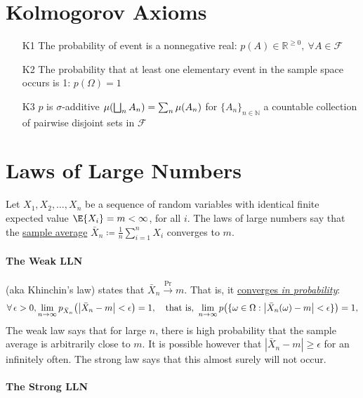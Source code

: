 \documentclass[a4paper]{article}
\theoremstyle{definition}
\newcommand\key\uline%
\renewcommand\right\mright%
\renewcommand\left\mleft%
\begin{document}
\section*{Kolmogorov Axioms}

\begin{itemize}
  \item[K1] The probability of event is a nonnegative real: 
    $p(A) \in \mathbb{R}^{\ge 0},\ \forall A\in\mathcal{F}$
  \item[K2] The probability that at least one elementary event in the sample
    space occurs is 1: $p(\Omega) = 1$
  \item[K3] $p$ is $\sigma$-additive
    \(\mu\left(\bigsqcup_{n}A_n\right)=\sum_{n}\mu(A_n)\)
    for ${\{A_n\}}_{n\in \mathbb{N}}$ a countable collection of pairwise
    disjoint sets in $\mathcal{F}$
\end{itemize}
\section*{Laws of Large Numbers}%
\label{sec:LLN}

Let $X_1, X_2, \ldots, X_n$ be a sequence of random variables with identical
finite expected value $\E{X_i} = m < \infty$, for all $i$.
The laws of large numbers say that the \key{sample average}
$\bar{X}_n\coloneqq\frac1n\sum_{i=1}^n X_i$ converges to $m$.

\paragraph{The Weak LLN}

(aka Khinchin's law) states that $\bar{X}_n \xrightarrow{\Pr} m$.
That is, it \key{converges \emph{in probability}}:
\begin{equation*}
  \forall \, \epsilon>0, \lim_{n\to\infty}
  p_{\bar{X}_n}\left( \left|\bar{X}_n - m \right| < \epsilon \right) = 1,
  \quad\text{that is, }
  \lim_{n\to\infty} p\left(\{\omega\in \Omega \mathrel{:}
  \left|\bar{X}_n(\omega) - m \right| < \epsilon \}\right) = 1,
\end{equation*}
The weak law says that for large $n$, there is high probability
that the sample average is arbitrarily close to $m$.  It is possible however
that $|\bar{X}_n -m| \ge \epsilon$ for an infinitely often.
The strong law says that this almost surely will not occur.

\paragraph{The Strong LLN}
\end{document}
